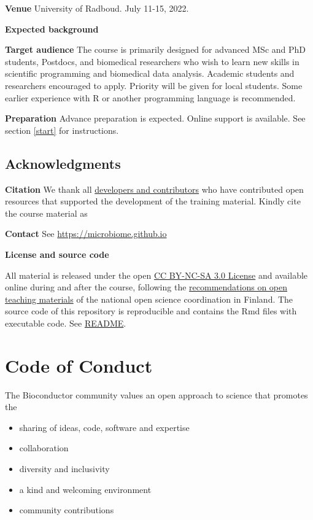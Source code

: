 \documentclass[
  oneside]{book}
\providecommand{\tightlist}{%
  \setlength{\itemsep}{0pt}\setlength{\parskip}{0pt}}
\begin{document}
\textbf{Venue} University of Radboud. July 11-15, 2022.

\textbf{Expected background}

\textbf{Target audience} The course is primarily designed for advanced MSc
and PhD students, Postdocs, and biomedical researchers who wish to
learn new skills in scientific programming and biomedical data
analysis. Academic students and researchers encouraged to
apply. Priority will be given for local students. Some earlier
experience with R or another programming language is recommended.

\textbf{Preparation} Advance preparation is expected. Online support is available. See section \ref{start} for instructions.

\hypertarget{acknowledgments}{%
\section{Acknowledgments}\label{acknowledgments}}

\textbf{Citation} We thank all \href{https://microbiome.github.io}{developers and contributors} who have contributed open resources that supported the development of the training material. Kindly cite the course material as \citet{radboud2022course}

\textbf{Contact} See \url{https://microbiome.github.io}

\textbf{License and source code}

All material is released under the open \href{LICENSE}{CC BY-NC-SA 3.0
License} and available online during and after the course,
following the \href{https://avointiede.fi/fi/linjaukset-ja-aineistot/kotimaiset-linjaukset/oppimisen-ja-oppimateriaalien-avoimuuden-linjaus}{recommendations on open teaching
materials}
of the national open science coordination in Finland. The source code
of this repository is reproducible and contains the Rmd files with
executable code. See \href{README.md}{README}.

\hypertarget{code-of-conduct}{%
\chapter{Code of Conduct}\label{code-of-conduct}}

The Bioconductor community values an open approach to science that promotes the

\begin{itemize}
\tightlist
\item
  sharing of ideas, code, software and expertise
\item
  collaboration
\item
  diversity and inclusivity
\item
  a kind and welcoming environment
\item
  community contributions
\end{itemize}
\end{document}
